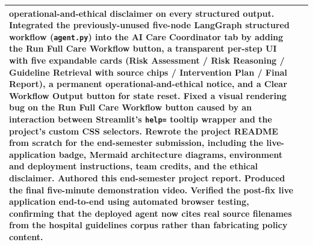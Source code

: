 \documentclass[11pt,a4paper]{article}
\begin{document}
\begin{longtable}{|>{\raggedright\arraybackslash}p{}|>{\raggedright\arraybackslash}p{}|}
operational-and-ethical disclaimer on every structured output.
Integrated the previously-unused five-node LangGraph structured
workflow (\texttt{agent.py}) into the AI Care Coordinator tab by adding
the \textbf{Run Full Care Workflow} button, a transparent per-step UI
with five expandable cards (Risk Assessment / Risk Reasoning /
Guideline Retrieval with source chips / Intervention Plan / Final Report),
a permanent operational-and-ethical notice, and a \textbf{Clear Workflow
Output} button for state reset. Fixed a visual rendering bug on the
\textbf{Run Full Care Workflow} button caused by an interaction between
Streamlit's \texttt{help=} tooltip wrapper and the project's custom CSS
selectors. Rewrote the project README from scratch for the end-semester
submission, including the live-application badge, Mermaid architecture
diagrams, environment and deployment instructions, team credits, and the
ethical disclaimer. Authored this end-semester project report. Produced
the final five-minute demonstration video. Verified the post-fix live
application end-to-end using automated browser testing, confirming that
the deployed agent now cites real source filenames from the hospital
guidelines corpus rather than fabricating policy content.\\ \hline
\end{longtable}
\end{document}
